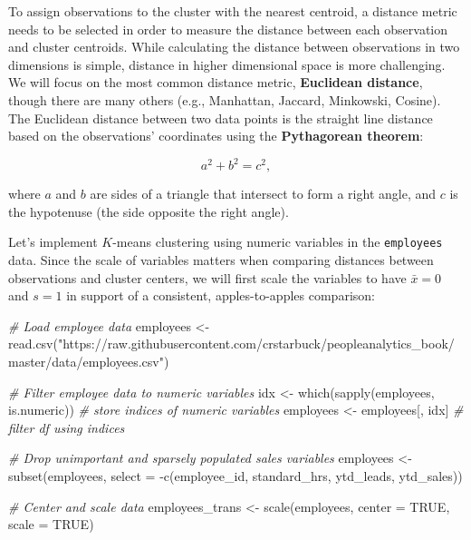 \documentclass[
]{book}
\newenvironment{Shaded}{\begin{snugshade}}{\end{snugshade}}
\newcommand{\AttributeTok}[1]{\textcolor[rgb]{0.77,0.63,0.00}{#1}}
\newcommand{\CommentTok}[1]{\textcolor[rgb]{0.56,0.35,0.01}{\textit{#1}}}
\newcommand{\ConstantTok}[1]{\textcolor[rgb]{0.00,0.00,0.00}{#1}}
\newcommand{\FunctionTok}[1]{\textcolor[rgb]{0.00,0.00,0.00}{#1}}
\newcommand{\NormalTok}[1]{#1}
\newcommand{\OtherTok}[1]{\textcolor[rgb]{0.56,0.35,0.01}{#1}}
\newcommand{\SpecialCharTok}[1]{\textcolor[rgb]{0.00,0.00,0.00}{#1}}
\newcommand{\StringTok}[1]{\textcolor[rgb]{0.31,0.60,0.02}{#1}}
\begin{document}
To assign observations to the cluster with the nearest centroid, a distance metric needs to be selected in order to measure the distance between each observation and cluster centroids. While calculating the distance between observations in two dimensions is simple, distance in higher dimensional space is more challenging. We will focus on the most common distance metric, \textbf{Euclidean distance}, though there are many others (e.g., Manhattan, Jaccard, Minkowski, Cosine). The Euclidean distance between two data points is the straight line distance based on the observations' coordinates using the \textbf{Pythagorean theorem}:

\[ a^2 + b^2 = c^2, \]

where \(a\) and \(b\) are sides of a triangle that intersect to form a right angle, and \(c\) is the hypotenuse (the side opposite the right angle).

Let's implement \(K\)-means clustering using numeric variables in the \texttt{employees} data. Since the scale of variables matters when comparing distances between observations and cluster centers, we will first scale the variables to have \(\bar{x} = 0\) and \(s = 1\) in support of a consistent, apples-to-apples comparison:

\begin{Shaded}
\begin{Highlighting}[]
\CommentTok{\# Load employee data}
\NormalTok{employees }\OtherTok{\textless{}{-}} \FunctionTok{read.csv}\NormalTok{(}\StringTok{"https://raw.githubusercontent.com/crstarbuck/peopleanalytics\_book/master/data/employees.csv"}\NormalTok{)}

\CommentTok{\# Filter employee data to numeric variables}
\NormalTok{idx }\OtherTok{\textless{}{-}} \FunctionTok{which}\NormalTok{(}\FunctionTok{sapply}\NormalTok{(employees, is.numeric)) }\CommentTok{\# store indices of numeric variables}
\NormalTok{employees }\OtherTok{\textless{}{-}}\NormalTok{ employees[, idx] }\CommentTok{\# filter df using indices}

\CommentTok{\# Drop unimportant and sparsely populated sales variables}
\NormalTok{employees }\OtherTok{\textless{}{-}} \FunctionTok{subset}\NormalTok{(employees, }\AttributeTok{select =} \SpecialCharTok{{-}}\FunctionTok{c}\NormalTok{(employee\_id, standard\_hrs, ytd\_leads, ytd\_sales))}

\CommentTok{\# Center and scale data}
\NormalTok{employees\_trans }\OtherTok{\textless{}{-}} \FunctionTok{scale}\NormalTok{(employees, }\AttributeTok{center =} \ConstantTok{TRUE}\NormalTok{, }\AttributeTok{scale =} \ConstantTok{TRUE}\NormalTok{)}
\end{Highlighting}
\end{Shaded}
\end{document}
